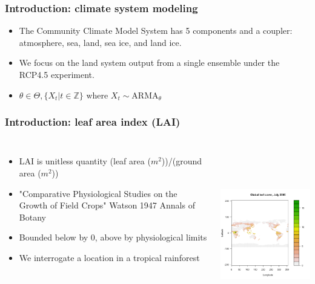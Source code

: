\documentclass{beamer}
\begin{document}
\begin{frame}
    \frametitle{Introduction: climate system modeling}
    \begin{itemize}
        \item The Community Climate Model System has 5 components and a coupler:
            atmosphere, sea, land, sea ice, and land ice.
        \item We focus on the land system output from a single ensemble under
            the RCP4.5 experiment.

        \item $\theta\in\Theta, \{X_t|t\in\mathbb{Z}\} \textrm{ where }
            X_t\sim \textrm{ARMA}_\theta$
    \end{itemize}
\end{frame}

\begin{frame}
    \frametitle{Introduction: leaf area index (LAI)}
    \begin{columns}

        \column{2in}
            \begin{itemize}
                \item LAI is unitless quantity (leaf area ($m^2$))/(ground area ($m^2$))
                \item "Comparative Physiological Studies on the Growth of Field Crops" Watson 1947 Annals of Botany
                \item Bounded below by 0, above by physiological limits
                \item We interrogate a location in a tropical rainforest
            \end{itemize}

        \column{3in}
            \includegraphics[height=3in]{../img/LAI_global_t0.png}

    \end{columns}
\end{frame}
\end{document}
